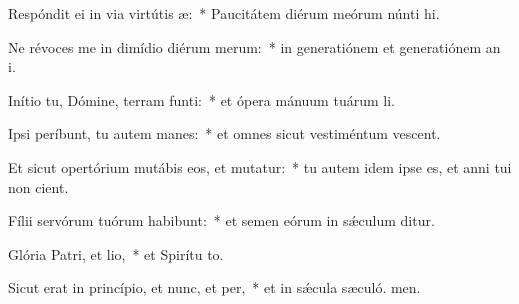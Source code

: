 \item Respóndit ei in via virtútis æ:~* Paucitátem diérum meórum núnti hi.
\item Ne révoces me in dimídio diérum merum:~* in generatiónem et generatiónem an i.
\item Inítio tu, Dómine, terram funti:~* et ópera mánuum tuárum  li.
\item Ipsi períbunt, tu autem manes:~* et omnes sicut vestiméntum vescent.
\item Et sicut opertórium mutábis eos, et mutatur:~* tu autem idem ipse es, et anni tui non cient.
\item Fílii servórum tuórum habibunt:~* et semen eórum in sǽculum ditur.
\item Glória Patri, et lio,~* et Spirítu to.
\item Sicut erat in princípio, et nunc, et per,~* et in sǽcula sæculó. men.
